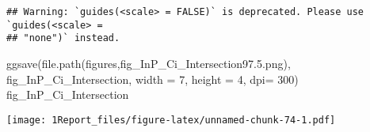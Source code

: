\documentclass[
]{article}
\newenvironment{Shaded}{\begin{snugshade}}{\end{snugshade}}
\newcommand{\AttributeTok}[1]{\textcolor[rgb]{0.77,0.63,0.00}{#1}}
\newcommand{\CommentTok}[1]{\textcolor[rgb]{0.56,0.35,0.01}{\textit{#1}}}
\newcommand{\DecValTok}[1]{\textcolor[rgb]{0.00,0.00,0.81}{#1}}
\newcommand{\FloatTok}[1]{\textcolor[rgb]{0.00,0.00,0.81}{#1}}
\newcommand{\FunctionTok}[1]{\textcolor[rgb]{0.00,0.00,0.00}{#1}}
\newcommand{\NormalTok}[1]{#1}
\newcommand{\OtherTok}[1]{\textcolor[rgb]{0.56,0.35,0.01}{#1}}
\newcommand{\SpecialCharTok}[1]{\textcolor[rgb]{0.00,0.00,0.00}{#1}}
\newcommand{\StringTok}[1]{\textcolor[rgb]{0.31,0.60,0.02}{#1}}
\begin{document}
\begin{verbatim}
## Warning: `guides(<scale> = FALSE)` is deprecated. Please use `guides(<scale> =
## "none")` instead.
\end{verbatim}

\begin{Shaded}
\begin{Highlighting}[]
\FunctionTok{ggsave}\NormalTok{(}\FunctionTok{file.path}\NormalTok{(}\StringTok{\textquotesingle{}figures\textquotesingle{}}\NormalTok{,}\StringTok{\textquotesingle{}fig\_InP\_Ci\_Intersection97.5.png\textquotesingle{}}\NormalTok{), fig\_InP\_Ci\_Intersection, }\AttributeTok{width =} \DecValTok{7}\NormalTok{, }\AttributeTok{height =} \DecValTok{4}\NormalTok{, }\AttributeTok{dpi=} \DecValTok{300}\NormalTok{)}
\NormalTok{fig\_InP\_Ci\_Intersection}
\end{Highlighting}
\end{Shaded}

\texttt{[image: 1Report\_files/figure-latex/unnamed-chunk-74-1.pdf]}

\begin{Shaded}
\end{Shaded}
\end{document}
